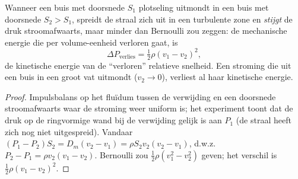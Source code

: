 \begin{proposition}\label{prop:b2:flow-balances:borda}
Wanneer een buis met doorsnede $S_1$ plotseling uitmondt in een buis met
doorsnede $S_2
> S_1$, spreidt de straal zich uit in een turbulente zone en
\emph{stijgt} de druk stroomafwaarts, maar minder dan Bernoulli zou zeggen:
de mechanische energie die per volume-eenheid verloren gaat, is
\[
\Delta P_{\text{verlies}} = \tfrac12\rho(v_1 - v_2)^2 ,
\]
de kinetische energie van de ``verloren'' relatieve snelheid. Een stroming
die uit een buis in een groot vat uitmondt ($v_2 \to 0$), verliest al haar
kinetische energie.
\end{proposition}

\begin{proof}
Impulsbalans op het fluïdum tussen de verwijding en een doorsnede
stroomafwaarts waar de stroming weer uniform is; het experiment toont dat de
druk op de ringvormige wand bij de verwijding gelijk is aan $P_1$ (de straal
heeft zich nog niet uitgespreid). Vandaar
$(P_1 - P_2)S_2 = D_m(v_2 - v_1) = \rho S_2v_2(v_2 -
v_1)$, d.w.z.\
$P_2 - P_1 = \rho v_2(v_1 - v_2)$. Bernoulli zou
$\tfrac12\rho(v_1^2 - v_2^2)$ geven; het verschil is
$\tfrac12\rho(v_1 - v_2)^2$.
\end{proof}

